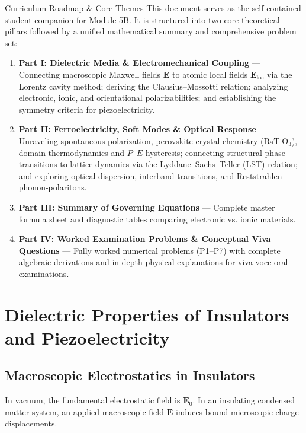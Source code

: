 \documentclass[11pt,a4paper]{article}
\begin{document}
\begin{takeawaybox}{Curriculum Roadmap \& Core Themes}
This document serves as the self-contained student companion for Module 5B. It is structured into two core theoretical pillars followed by a unified mathematical summary and comprehensive problem set:
\begin{enumerate}[leftmargin=*]
    \item \textbf{Part I: Dielectric Media \& Electromechanical Coupling} --- Connecting macroscopic Maxwell fields $\mathbf{E}$ to atomic local fields $\mathbf{E}_{\text{loc}}$ via the Lorentz cavity method; deriving the Clausius--Mossotti relation; analyzing electronic, ionic, and orientational polarizabilities; and establishing the symmetry criteria for piezoelectricity.
    \item \textbf{Part II: Ferroelectricity, Soft Modes \& Optical Response} --- Unraveling spontaneous polarization, perovskite crystal chemistry ($\text{BaTiO}_3$), domain thermodynamics and $P$--$E$ hysteresis; connecting structural phase transitions to lattice dynamics via the Lyddane--Sachs--Teller (LST) relation; and exploring optical dispersion, interband transitions, and Reststrahlen phonon-polaritons.
    \item \textbf{Part III: Summary of Governing Equations} --- Complete master formula sheet and diagnostic tables comparing electronic vs. ionic materials.
    \item \textbf{Part IV: Worked Examination Problems \& Conceptual Viva Questions} --- Fully worked numerical problems (P1--P7) with complete algebraic derivations and in-depth physical explanations for viva voce oral examinations.
\end{enumerate}
\end{takeawaybox}

\vspace{0.2cm}
\tableofcontents
\newpage

\section{Dielectric Properties of Insulators and Piezoelectricity}
\label{sec:dielectrics}


\textit{}

\subsection{Macroscopic Electrostatics in Insulators}
In vacuum, the fundamental electrostatic field is $\mathbf{E}_0$. In an insulating condensed matter system, an applied macroscopic field $\mathbf{E}$ induces bound microscopic charge displacements.
\end{document}
